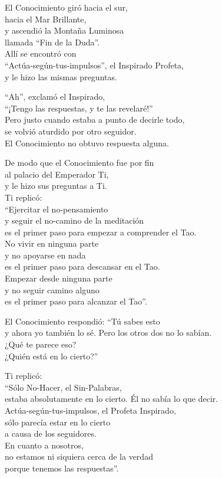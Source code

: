 \documentclass[book,b5paper,hidelinks,final]{memoir}
\begin{document}
	El Conocimiento giró hacia el sur,\\
	hacia el Mar Brillante,\\
	y ascendió la Montaña Luminosa\\
	llamada ``Fin de la Duda''.\\
	Allí se encontró con\\
	``Actúa-según-tus-impulsos'', el Inspirado Profeta,\\
	y le hizo las mismas preguntas.
	
	``Ah'', exclamó el Inspirado,\\
	``¡Tengo las respuestas, y te las revelaré!''\\
	Pero justo cuando estaba a punto de decirle todo,\\
	se volvió aturdido por otro seguidor.\\
	El Conocimiento no obtuvo respuesta alguna.
	
	De modo que el Conocimiento fue por fin\\
	al palacio del Emperador Ti,\\
	y le hizo sus preguntas a Ti.\\
	Ti replicó:\\
	``Ejercitar el no-pensamiento\\
	y seguir el no-camino de la meditación\\
	es el primer paso para empezar a comprender el Tao.\\
	No vivir en ninguna parte\\
	y no apoyarse en nada\\
	es el primer paso para descansar en el Tao.\\
	Empezar desde ninguna parte\\
	y no seguir camino alguno\\
	es el primer paso para alcanzar el Tao''.
	
	El Conocimiento respondió: ``Tú sabes esto\\
	y ahora yo también lo sé. Pero los otros dos no lo sabían.\\
	¿Qué te parece eso?\\
	¿Quién está en lo cierto?''
	
	Ti replicó:\\
	``Sólo No-Hacer, el Sin-Palabras,\\
	estaba absolutamente en lo cierto. Él no sabía lo que decir.\\
	Actúa-según-tus-impulsos, el Profeta Inspirado,\\
	sólo parecía estar en lo cierto\\
	a causa de los seguidores.\\
	En cuanto a nosotros,\\
	no estamos ni siquiera cerca de la verdad\\
	porque tenemos las respuestas''.
	
\end{document}
